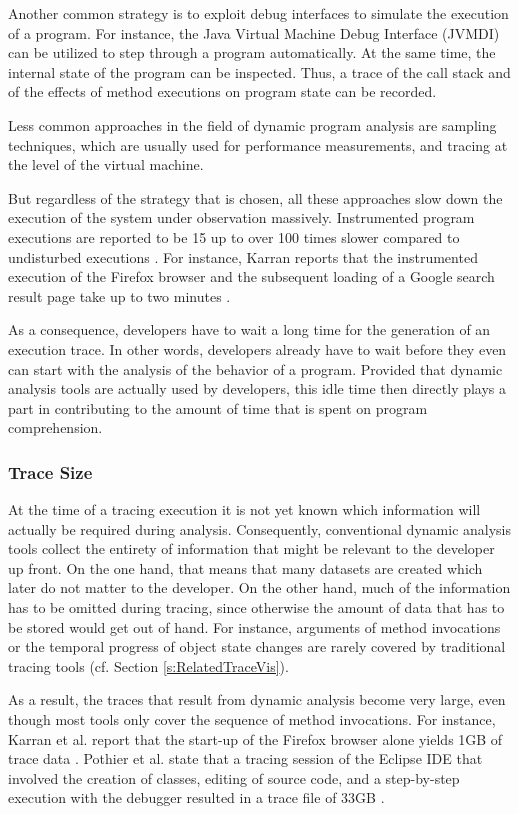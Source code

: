 Another common strategy is to exploit debug interfaces to simulate the execution of a program.
For instance, the Java Virtual Machine Debug Interface (JVMDI) can be utilized to step through a program automatically.
At the same time, the internal state of the program can be inspected.
Thus, a trace of the call stack and of the effects of method executions on program state can be recorded.

Less common approaches in the field of dynamic program analysis are sampling techniques, which are usually used for performance measurements, and tracing at the level of the virtual machine.

But regardless of the strategy that is chosen, all these approaches slow down the execution of the system under observation massively.
Instrumented program executions are reported to be 15 up to over 100 times slower compared to undisturbed executions \cite{pothier_scalable_2007, karran_synctrace:_2013}.
For instance, Karran reports that the instrumented execution of the Firefox browser and the subsequent loading of a Google search result page take up to two minutes \cite{karran_extraction_2013}.

As a consequence, developers have to wait a long time for the generation of an execution trace.
In other words, developers already have to wait before they even can start with the analysis of the behavior of a program.
Provided that dynamic analysis tools are actually used by developers, this idle time then directly plays a part in contributing to the amount of time that is spent on program comprehension.

\subsubsection{Trace Size}
At the time of a tracing execution it is not yet known which information will actually be required during analysis.
Consequently, conventional dynamic analysis tools collect the entirety of information that might be relevant to the developer up front.
On the one hand, that means that many datasets are created which later do not matter to the developer.
On the other hand, much of the information has to be omitted during tracing, since otherwise the amount of data that has to be stored would get out of hand.
For instance, arguments of method invocations or the temporal progress of object state changes are rarely covered by traditional tracing tools (cf. Section \ref{s:RelatedTraceVis}).

As a result, the traces that result from dynamic analysis become very large, even though most tools only cover the sequence of method invocations.
For instance, Karran et al. report that the start-up of the Firefox browser alone yields 1GB of trace data \cite{karran_extraction_2013}.
Pothier et al. state that a tracing session of the Eclipse IDE that involved the creation of classes, editing of source code, and a step-by-step execution with the debugger resulted in a trace file of 33GB \cite{pothier_scalable_2007}.

